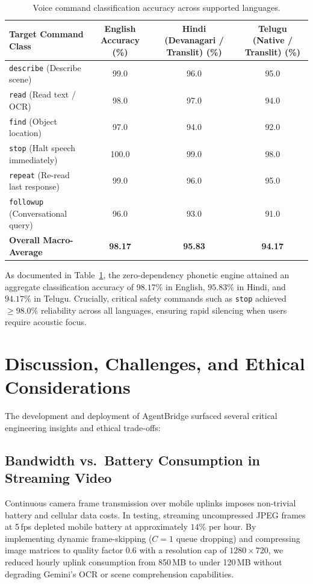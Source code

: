 \documentclass[10pt,a4paper]{article}
\begin{document}
\begin{table}[htbp]
\centering
\caption{Voice command classification accuracy across supported languages.}
\label{tab:voice_command_accuracy}
\small
\begin{tabular}{lccc}
\toprule
Target Command Class & English Accuracy (\%) & Hindi (Devanagari / Translit) (\%) & Telugu (Native / Translit) (\%) \\
\midrule
\texttt{describe} (Describe scene) & 99.0 & 96.0 & 95.0 \\
\texttt{read} (Read text / OCR) & 98.0 & 97.0 & 94.0 \\
\texttt{find} (Object location) & 97.0 & 94.0 & 92.0 \\
\texttt{stop} (Halt speech immediately) & 100.0 & 99.0 & 98.0 \\
\texttt{repeat} (Re-read last response) & 99.0 & 96.0 & 95.0 \\
\texttt{followup} (Conversational query) & 96.0 & 93.0 & 91.0 \\
\midrule
\textbf{Overall Macro-Average} & \textbf{98.17} & \textbf{95.83} & \textbf{94.17} \\
\bottomrule
\end{tabular}
\end{table}

As documented in Table~\ref{tab:voice_command_accuracy}, the zero-dependency phonetic engine attained an aggregate classification accuracy of $98.17\%$ in English, $95.83\%$ in Hindi, and $94.17\%$ in Telugu. Crucially, critical safety commands such as \texttt{stop} achieved $\ge 98.0\%$ reliability across all languages, ensuring rapid silencing when users require acoustic focus.

\FloatBarrier
\section{Discussion, Challenges, and Ethical Considerations}

The development and deployment of AgentBridge surfaced several critical engineering insights and ethical trade-offs:

\subsection{Bandwidth vs.\ Battery Consumption in Streaming Video}
Continuous camera frame transmission over mobile uplinks imposes non-trivial battery and cellular data costs. In testing, streaming uncompressed JPEG frames at 5\,fps depleted mobile battery at approximately $14\%$ per hour. By implementing dynamic frame-skipping ($C=1$ queue dropping) and compressing image matrices to quality factor $0.6$ with a resolution cap of $1280 \times 720$, we reduced hourly uplink consumption from 850\,MB to under 120\,MB without degrading Gemini's OCR or scene comprehension capabilities.
\end{document}
